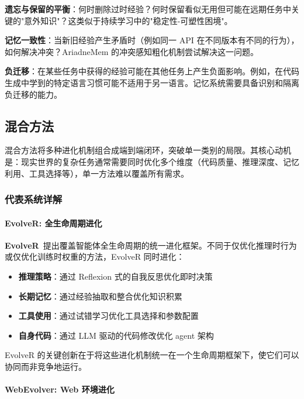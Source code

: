 \textbf{遗忘与保留的平衡}：何时删除过时经验？何时保留看似无用但可能在远期任务中关键的"意外知识"？这类似于持续学习中的"稳定性-可塑性困境"。

\textbf{记忆一致性}：当新旧经验产生矛盾时（例如同一 API 在不同版本有不同的行为），如何解决冲突？AriadneMem 的冲突感知粗化机制尝试解决这一问题。

\textbf{负迁移}：在某些任务中获得的经验可能在其他任务上产生负面影响。例如，在代码生成中学到的特定语言习惯可能不适用于另一语言。记忆系统需要具备识别和隔离负迁移的能力。

\subsection{混合方法}\label{sec:hybrid}

混合方法将多种进化机制组合成端到端闭环，突破单一类别的局限。其核心动机是：现实世界的复杂任务通常需要同时优化多个维度（代码质量、推理深度、记忆利用、工具选择等），单一方法难以覆盖所有需求。

\subsubsection{代表系统详解}

\paragraph{EvolveR: 全生命周期进化}

\textbf{EvolveR}~\citep{evolver2024}提出覆盖智能体全生命周期的统一进化框架。不同于仅优化推理时行为或仅优化训练时权重的方法，EvolveR 同时进化：
\begin{itemize}
\item \textbf{推理策略}：通过 Reflexion 式的自我反思优化即时决策
\item \textbf{长期记忆}：通过经验抽取和整合优化知识积累
\item \textbf{工具使用}：通过试错学习优化工具选择和参数配置
\item \textbf{自身代码}：通过 LLM 驱动的代码修改优化 agent 架构
\end{itemize}

EvolveR 的关键创新在于将这些进化机制统一在一个生命周期框架下，使它们可以协同而非竞争地运行。

\paragraph{WebEvolver: Web 环境进化}

